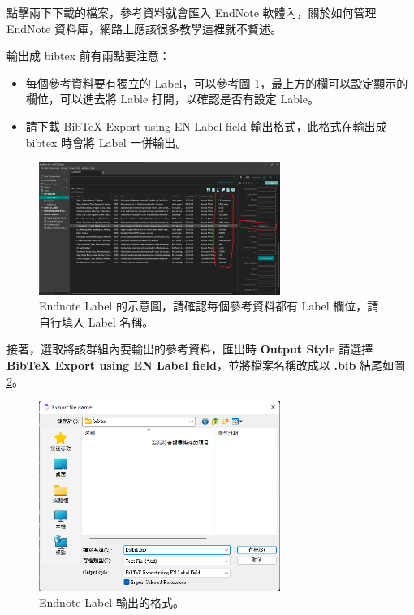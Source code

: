 點擊兩下下載的檔案，參考資料就會匯入 EndNote 軟體內，關於如何管理 EndNote 資料庫，網路上應該很多教學這裡就不贅述。

輸出成 bibtex 前有兩點要注意：
\begin{itemize}
    \item 每個參考資料要有獨立的 Label，可以參考圖 \ref{fig_endnote_label}，最上方的欄可以設定顯示的欄位，可以進去將 Lable 打開，以確認是否有設定 Lable。
    \item 請下載 \href{https://endnote.com/style_download/bibtex-export-using-en-label-field/}{BibTeX Export using EN Label field} 輸出格式，此格式在輸出成 bibtex 時會將 Label 一併輸出。
\end{itemize}

\begin{figure}[!h] 
    \centering 
    \includegraphics[width=0.7\textwidth]{Figures/Endnote/endnoteLabel.png} 
    \caption{Endnote Label 的示意圖，請確認每個參考資料都有 Label 欄位，請自行填入 Label 名稱。}
    \label{fig_endnote_label}
\end{figure}

接著，選取將該群組內要輸出的參考資料，匯出時 \textbf{Output Style} 請選擇 \textbf{BibTeX Export using EN Label field}，並將檔案名稱改成以 \textbf{.bib} 結尾如圖 \ref{fig_bib_export}。

\begin{figure}[H] 
    \centering 
    \includegraphics[width=0.7\textwidth]{Figures/Endnote/testbib.png} 
    \caption{Endnote Label 輸出的格式。}
    \label{fig_bib_export}
\end{figure}

